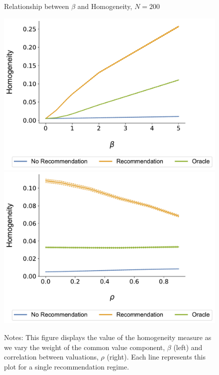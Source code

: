 \documentclass[manuscript]{acmart}
\begin{document}
\begin{figure}[ht]
\caption{Relationship between $\beta$ and Homogeneity, $N = 200$}
\includegraphics[width=.3\linewidth]{figures/beta_homogeneity_N_200_T_20}
\includegraphics[width=.3\linewidth]{figures/rho_homogeneity_N_200_T_20}\label{fig:beta_homo}
\caption*{\scriptsize Notes: This figure displays the value of the homogeneity measure as we vary the weight of the common value component, $\beta$ (left) and correlation between valuations, $\rho$ (right). Each line represents this plot for a single recommendation regime.}
\end{figure}
\end{document}
